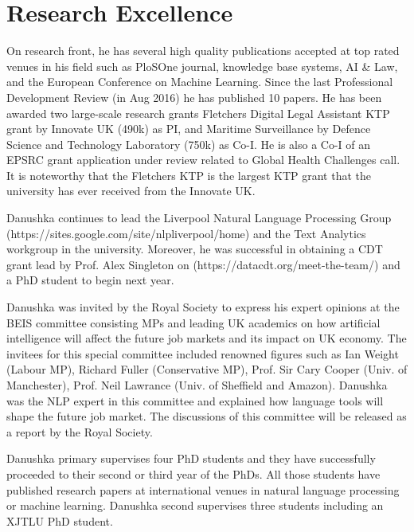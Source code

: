 \section{Research Excellence}



On research front, he has several high quality publications accepted at top rated venues in his field such as PloSOne journal, knowledge base systems, AI & Law, and the European Conference on Machine Learning. Since the last Professional Development Review (in Aug 2016) he has published 10 papers. He has been awarded two large-scale research grants Fletchers Digital Legal Assistant KTP grant by Innovate UK (490k) as PI, and Maritime Surveillance by Defence Science and Technology Laboratory (750k) as Co-I. He is also a Co-I of an EPSRC grant application under review related to Global Health Challenges call. It is noteworthy that the Fletchers KTP is the largest KTP grant that the university has ever received from the Innovate UK.

Danushka continues to lead the Liverpool Natural Language Processing Group (https://sites.google.com/site/nlpliverpool/home) and the Text Analytics workgroup in the university. Moreover, he was successful in obtaining a CDT grant lead by Prof. Alex Singleton on (https://datacdt.org/meet-the-team/) and a PhD student to begin next year.

Danushka was invited by the Royal Society to express his expert opinions at the BEIS committee consisting MPs and leading UK academics on how artificial intelligence will affect the future job markets and its impact on UK economy. The invitees for this special committee included renowned figures such as Ian Weight (Labour MP), Richard Fuller (Conservative MP), Prof. Sir Cary Cooper (Univ. of Manchester), Prof. Neil Lawrance (Univ. of Sheffield and Amazon). Danushka was the NLP expert in this committee and explained how language tools will shape the future job market. The discussions of this committee will be released as a report by the Royal Society.

Danushka primary supervises four PhD students and they have successfully proceeded to their second or third year of the PhDs. All those students have published research papers at international venues in natural language processing or machine learning. Danushka second supervises three students including an XJTLU PhD student.

